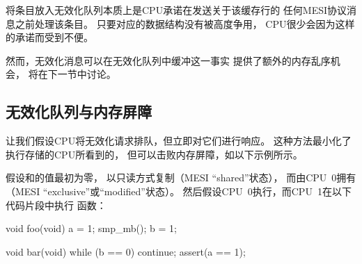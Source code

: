 将条目放入无效化队列本质上是CPU承诺在发送关于该缓存行的
任何MESI协议消息之前处理该条目。
只要对应的数据结构没有被高度争用，
CPU很少会因为这样的承诺而受到不便。

然而，无效化消息可以在无效化队列中缓冲这一事实
提供了额外的内存乱序机会，
将在下一节中讨论。

\subsection{无效化队列与内存屏障}
\label{sec:app:whymb:Invalidate Queues and Memory Barriers}

让我们假设CPU将无效化请求排队，但立即对它们进行响应。
这种方法最小化了执行存储的CPU所看到的，
但可以击败内存屏障，如以下示例所示。

假设和的值最初为零，
以只读方式复制（MESI ``shared''状态），
而由CPU~0拥有（MESI ``exclusive''或``modified''状态）。
然后假设CPU~0执行，而CPU~1在以下代码片段中执行
函数：

\begin{fcvlabel}
\begin{VerbatimN}[fontsize=\footnotesize,samepage=true,commandchars=\\\[\]]
void foo(void)
{
	a = 1;
	smp_mb();	\lnlbl[mb]
	b = 1;
}

void bar(void)
{
	while (b == 0) continue;
	assert(a == 1);
}
\end{VerbatimN}
\end{fcvlabel}

